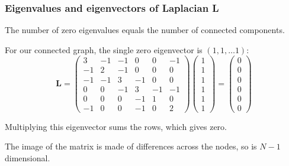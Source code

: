 \documentclass[10pt,aspectratio=169,dvipsnames]{beamer}
\begin{document}
\begin{frame}
  \frametitle{Eigenvalues and eigenvectors of Laplacian L}

  The number of zero eigenvalues equals the number of connected components.

  For our connected graph, the single zero eigenvector is $(1,1,\dots 1)$:
\begin{equation*}
\mathbf{L}=\left(\begin{matrix}
3 & -1 & -1 & 0 & 0 & -1\\
-1 & 2 & -1 & 0 & 0 & 0\\
-1 & -1 & 3 & -1 & 0 & 0\\
0 & 0 & -1 & 3 & -1 & -1\\
0 & 0 & 0 & -1 & 1 & 0\\
-1 & 0 & 0 & -1 & 0 & 2
\end{matrix}\right)  \left(\begin{matrix}
1 \\
1 \\
1 \\
1 \\
1 \\
1
\end{matrix}\right)= \left(\begin{matrix}
0 \\
0 \\
0 \\
0 \\
0 \\
0
\end{matrix}\right)
\end{equation*}

Multiplying this eigenvector sums the rows, which gives zero.

The image of the matrix is made of differences across the nodes, so is $N-1$ dimensional.

\end{frame}
\end{document}
